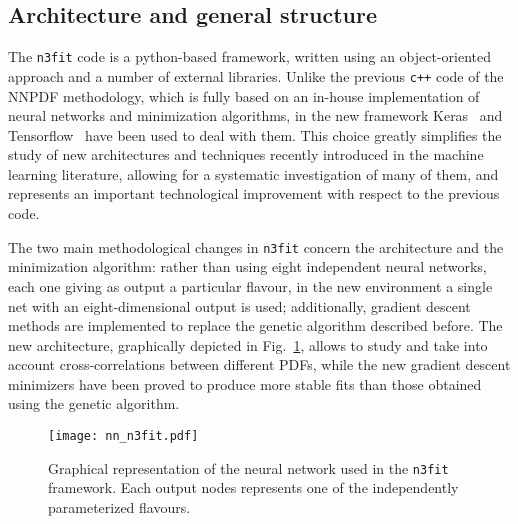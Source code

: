 \subsection{Architecture and general structure}
The {\tt n3fit} code is a python-based framework, written using an object-oriented approach and
a number of external libraries. 
Unlike the previous {\tt c++} code of the NNPDF methodology, 
which is fully based on an in-house implementation of neural networks and minimization algorithms,
in the new framework Keras~\cite{chollet2015keras} and Tensorflow~\cite{tensorflow2015-whitepaper} have been used to deal with them.
This choice greatly simplifies the study of new architectures and techniques recently introduced
in the machine learning literature, allowing for a systematic investigation of many of them, 
and represents an important technological improvement with respect 
to the previous code. 

%
The two main methodological changes in {\tt n3fit} concern the architecture and the minimization algorithm:
rather than using eight independent neural networks, each one giving as output a particular flavour, in
the new environment a single net with an eight-dimensional output is used; additionally, gradient descent
methods are implemented to replace the genetic algorithm described before.
The new architecture, graphically depicted in Fig.~\ref{fig:nn_n3fit}, allows to study and take into account 
cross-correlations between different PDFs,
while the new gradient descent minimizers have been proved to produce more stable fits than those 
obtained using the genetic algorithm. 

\begin{figure}[htb]     
	\begin{center}
		\texttt{[image: nn\_n3fit.pdf]}
	\end{center}
    \caption{Graphical representation of the neural network used in the {\tt n3fit} framework.
    Each output nodes represents one of the independently parameterized flavours.}
	\label{fig:nn_n3fit}                 
\end{figure}

